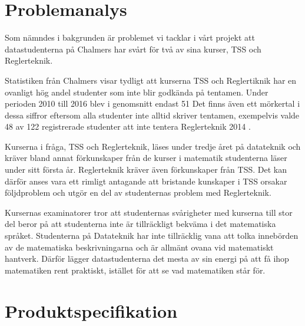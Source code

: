 \documentclass[]{article}
\begin{document}
\section{Problemanalys}


Som nämndes i bakgrunden är problemet vi tacklar i vårt projekt att
datastudenterna på Chalmers har svårt för två av sina kurser,
TSS och Reglerteknik.

Statistiken från Chalmers visar tydligt att kurserna TSS och Reglertiknik
har en ovanligt hög andel studenter som inte blir godkända på tentamen.
Under perioden 2010 till 2016 blev i genomsnitt endast 51
Det finns även ett mörkertal i dessa siffror eftersom alla studenter
inte alltid skriver tentamen, exempelvis valde 48 av 122 registrerade
studenter att inte tentera Reglerteknik 2014
\cite{kursinformation:ere102:14-15}.

Kurserna i fråga, TSS och Reglerteknik, läses under tredje året på
datateknik och kräver bland annat förkunskaper från de kurser i matematik
studenterna läser under sitt första år. Reglerteknik kräver även förkunskaper
från TSS. Det kan därför anses vara ett rimligt antagande att bristande
kunskaper i TSS orsakar följdproblem och utgör en del av studenternas
problem med Reglerteknik.

Kursernas examinatorer tror att studenternas svårigheter med kurserna till
stor del beror på att studenterna inte är tillräckligt bekväma
i det matematiska språket. Studenterna på Datateknik har inte tillräcklig
vana att tolka innebörden av de matematiska beskrivningarna och är allmänt
ovana vid matematiskt hantverk. Därför lägger datastudenterna det mesta av
sin energi på att få ihop matematiken rent praktiskt,
istället för att se vad matematiken står för.


\section{Produktspecifikation}
\end{document}
